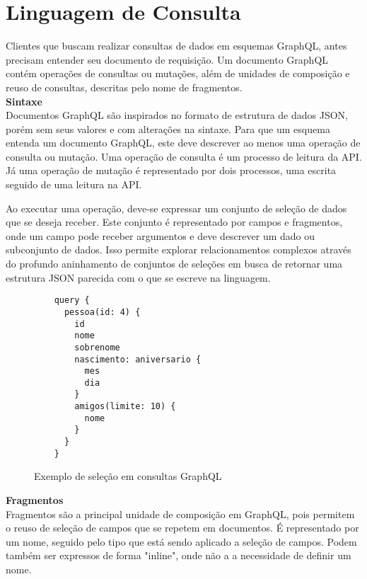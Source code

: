 \section[Linguagem de Consulta]{Linguagem de Consulta}

Clientes que buscam realizar consultas de dados em esquemas GraphQL, antes precisam entender seu documento de requisição. Um documento GraphQL contém operações de consultas ou mutações, além de unidades de composição e reuso de consultas, descritas pelo nome de fragmentos. \cite{GraphQL2016} \\

\textbf{Sintaxe} \\

Documentos GraphQL são inspirados no formato de estrutura de dados JSON, porém sem seus valores e com alterações na sintaxe. Para que um esquema entenda um documento GraphQL, este deve descrever ao menos uma operação de consulta ou mutação. Uma operação de consulta é um processo de leitura da API. Já uma operação de mutação é representado por dois processos, uma escrita seguido de uma leitura na API.

Ao executar uma operação, deve-se expressar um conjunto de seleção de dados que se deseja receber. Este conjunto é representado por campos e fragmentos, onde um campo pode receber argumentos e deve descrever um dado ou subconjunto de dados. Isso permite explorar relacionamentos complexos através do profundo aninhamento de conjuntos de seleções em busca de retornar uma estrutura JSON parecida com o que se escreve na linguagem.

\begin{figure}[H]
  \centering
  \begin{verbatim}
    query {
      pessoa(id: 4) {
        id
        nome
        sobrenome
        nascimento: aniversario {
          mes
          dia
        }
        amigos(limite: 10) {
          nome
        }
      }
    }
  \end{verbatim}
  \caption{Exemplo de seleção em consultas GraphQL}
\end{figure}

\textbf{Fragmentos} \\

Fragmentos são a principal unidade de composição em GraphQL, pois permitem o reuso de seleção de campos que se repetem em documentos. É representado por um nome, seguido pelo tipo que está sendo aplicado a seleção de campos. Podem também ser expressos de forma "inline", onde não a a necessidade de definir um nome.

